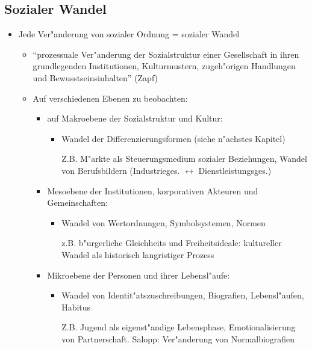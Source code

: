 \subsection{Sozialer Wandel}
\begin{itemize}
	\item
		Jede Ver"anderung von sozialer Ordnung = sozialer Wandel
		\begin{itemize}
			\item
				\enquote{prozessuale Ver"anderung der Sozialstruktur einer Gesellschaft in ihren grundlegenden Institutionen, Kulturmustern, zugeh"origen Handlungen und Bewusstseinsinhalten} (Zapf)
			\item
				Auf verschiedenen Ebenen zu beobachten:  
				\begin{itemize}
					\item auf Makroebene der Sozialstruktur und Kultur:
						\begin{itemize}
							\item
								Wandel der Differenzierungsformen (siehe n"achstes Kapitel)

								Z.B. M"arkte als Steuerungsmedium sozialer Beziehungen, Wandel von Berufsbildern (Industrieges. $\leftrightarrow$ Dienstleistungsges.)
						\end{itemize}

					\item
						Mesoebene der Institutionen, korporativen Akteuren und Gemeinschaften:
						\begin{itemize}
							\item
								Wandel von Wertordnungen, Symbolsystemen, Normen

								z.B. b"urgerliche Gleichheits und Freiheitsideale: kultureller Wandel als historisch langristiger Prozess
						\end{itemize}
					\item
					 Mikroebene der Personen und ihrer Lebensl"aufe:
					 \begin{itemize}
						 \item
							 Wandel von Identit"atszuschreibungen, Biografien, Lebensl"aufen, Habitus

							 Z.B. Jugend als eigenst"andige Lebensphase, Emotionalisierung von Partnerschaft. Salopp: Ver"anderung von Normalbiografien
					 \end{itemize}
				\end{itemize}


\end{itemize}
\end{itemize}
